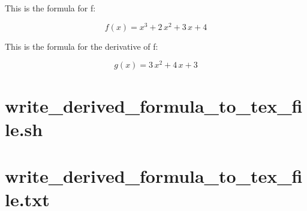 \documentclass{article}
\begin{document}
This is the formula for f:

$$f\left(x\right)=x^3+2\,x^2+3\,x+4$$

This is the formula for the derivative of f:

$$g\left(x\right)=3\,x^2+4\,x+3$$

\appendix

\section{write\_derived\_formula\_to\_tex\_file.sh}



\section{write\_derived\_formula\_to\_tex\_file.txt}


\end{document}
